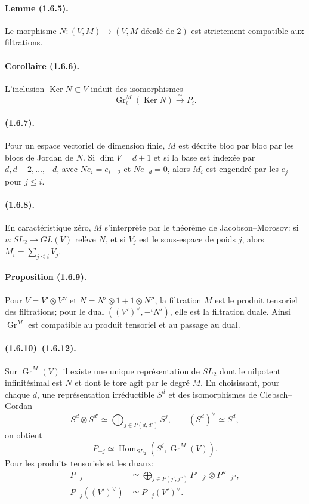 \documentclass[11pt]{article}
\theoremstyle{remark}
\newcommand{\Hom}{\operatorname{Hom}}
\newcommand{\Gr}{\operatorname{Gr}}
\newcommand{\Ker}{\operatorname{Ker}}
\begin{document}
\paragraph{Lemme (1.6.5).} Le morphisme $N:(V,M)\to(V,M\text{ décalé de }2)$ est strictement compatible aux filtrations.

\paragraph{Corollaire (1.6.6).} L'inclusion $\Ker N\subset V$ induit des isomorphismes
\[
        \Gr^M_i(\Ker N)\xrightarrow{\sim}P_i.
\]

\paragraph{(1.6.7).} Pour un espace vectoriel de dimension finie, $M$ est décrite bloc par bloc par les blocs de Jordan de $N$. Si $\dim V=d+1$ et si la base est indexée par $d,d-2,\ldots,-d$, avec $Ne_i=e_{i-2}$ et $Ne_{-d}=0$, alors $M_i$ est engendré par les $e_j$ pour $j\le i$.

\paragraph{(1.6.8).} En caractéristique zéro, $M$ s'interprète par le théorème de Jacobson--Morosov: si $u:SL_2\to GL(V)$ relève $N$, et si $V_j$ est le sous-espace de poids $j$, alors $M_i=\sum_{j\le i}V_j$.

\paragraph{Proposition (1.6.9).} Pour $V=V'\otimes V''$ et $N=N'\otimes1+1\otimes N''$, la filtration $M$ est le produit tensoriel des filtrations; pour le dual $((V')^\vee,-{}^tN')$, elle est la filtration duale. Ainsi $\Gr^M$ est compatible au produit tensoriel et au passage au dual.

\paragraph{(1.6.10)--(1.6.12).} Sur $\Gr^M(V)$ il existe une unique représentation de $SL_2$ dont le nilpotent infinitésimal est $N$ et dont le tore agit par le degré $M$. En choisissant, pour chaque $d$, une représentation irréductible $S^d$ et des isomorphismes de Clebsch--Gordan
\[
        S^d\otimes S^{d'}\simeq \bigoplus_{j\in P(d,d')}S^j,
        \qquad (S^d)^\vee\simeq S^d,
\]
on obtient
\begin{equation}\tag{1.6.11.5}
        P_{-j}\simeq \Hom_{SL_2}(S^j,\Gr^M(V)).
\end{equation}
Pour les produits tensoriels et les duaux:
\begin{align}
        P_{-j}&\simeq \bigoplus_{j\in P(j',j'')} P'_{-j'}\otimes P''_{-j''},\tag{1.6.12.1}\\
        P_{-j}((V')^\vee)&\simeq P_{-j}(V')^\vee.\tag{1.6.12.2}
\end{align}
\end{document}
